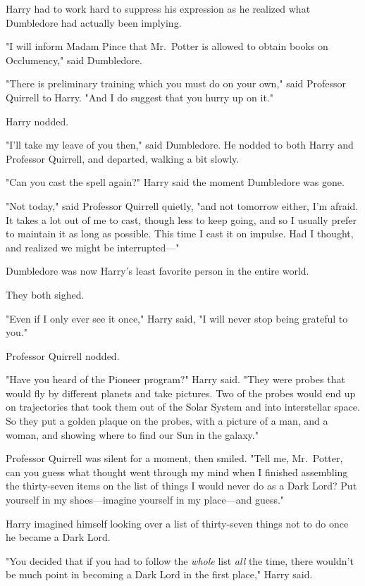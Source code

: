 Harry had to work hard to suppress his expression as he realized what 
Dumbledore had actually been implying.

"I will inform Madam Pince that Mr.~Potter is allowed to obtain books on 
Occlumency," said Dumbledore.

"There is preliminary training which you must do on your own," said Professor 
Quirrell to Harry. "And I do suggest that you hurry up on it."

Harry nodded.

"I'll take my leave of you then," said Dumbledore. He nodded to both Harry and 
Professor Quirrell, and departed, walking a bit slowly.

"Can you cast the spell again?" Harry said the moment Dumbledore was gone.

"Not today," said Professor Quirrell quietly, "and not tomorrow either, I'm 
afraid. It takes a lot out of me to cast, though less to keep going, and so I 
usually prefer to maintain it as long as possible. This time I cast it on 
impulse. Had I thought, and realized we might be interrupted---"

Dumbledore was now Harry's least favorite person in the entire world.

They both sighed.

"Even if I only ever see it once," Harry said, "I will never stop being 
grateful to you."

Professor Quirrell nodded.

"Have you heard of the Pioneer program?" Harry said. "They were probes that 
would fly by different planets and take pictures. Two of the probes would end 
up on trajectories that took them out of the Solar System and into interstellar 
space. So they put a golden plaque on the probes, with a picture of a man, and 
a woman, and showing where to find our Sun in the galaxy."

Professor Quirrell was silent for a moment, then smiled. "Tell me, Mr.~Potter, 
can you guess what thought went through my mind when I finished assembling the 
thirty-seven items on the list of things I would never do as a Dark Lord? Put 
yourself in my shoes---imagine yourself in my place---and guess."

Harry imagined himself looking over a list of thirty-seven things not to do 
once he became a Dark Lord.

"You decided that if you had to follow the \emph{whole} list \emph{all} the 
time, there wouldn't be much point in becoming a Dark Lord in the first place," 
Harry said.

